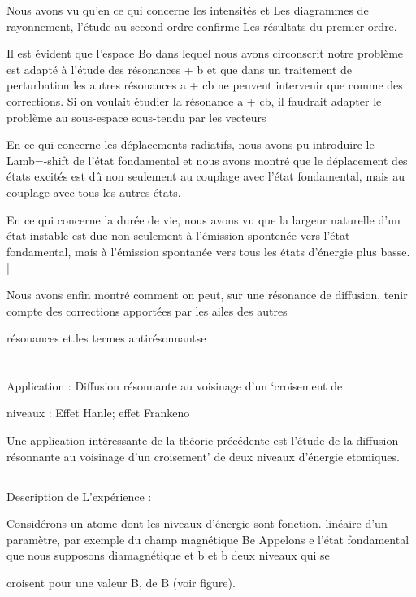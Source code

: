 Nous avons vu qu'en ce qui concerne les intensités et Les diagrammes de rayonnement, l'étude au second ordre confirme Les résultats du premier
ordre.


Il est évident que l'espace Bo dans lequel nous avons circonscrit notre problème est adapté à l'étude des résonances  + b et que dans un traitement de
perturbation les autres résonances a + cb ne peuvent intervenir que comme des
corrections. Si on voulait étudier la résonance a + cb, il faudrait adapter
le problème au sous-espace  sous-tendu par les vecteurs

En ce qui concerne les déplacements radiatifs, nous avons pu
introduire le Lamb=-shift de l'état fondamental et nous avons montré que le
déplacement des états excités est dû non seulement au couplage avec l'état
fondamental, mais au couplage avec tous les autres états.

En ce qui concerne la durée de vie, nous avons vu que la largeur naturelle d'un état instable est due non seulement à l'émission spontenée vers l'état fondamental, mais à l'émission spontanée vers tous les états
d'énergie plus basse. |

Nous avons enfin montré comment on peut, sur une résonance de
diffusion, tenir compte des corrections apportées par les ailes des autres

résonances et.les termes antirésonnantse

\section{} Application : Diffusion résonnante au voisinage d'un ‘croisement de%

niveaux : Effet Hanle; effet Frankeno

Une application intéressante de la théorie précédente est l'étude
de la diffusion résonnante au voisinage d'un croisement’ de deux niveaux d'énergie etomiques.

\subsection{} Description de L'expérience :%

Considérons un atome dont les niveaux d'énergie sont fonction.
linéaire d'un paramètre, par exemple du champ magnétique Be Appelons e l'état
fondamental que nous supposons diamagnétique et b et b deux niveaux qui se

croisent pour une valeur B, de B (voir figure).

